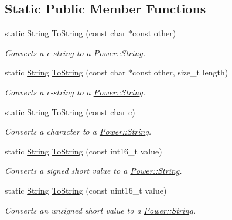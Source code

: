 \subsection*{Static Public Member Functions}
\begin{DoxyCompactItemize}
\item 
static \hyperlink{class_power_1_1_string}{String} \hyperlink{class_power_1_1_string_a8c1588b3f0b9edb49f72ecb3f83e6d8f}{To\+String} (const char $\ast$const other)
\begin{DoxyCompactList}\small\item\em Converts a c-\/string to a \hyperlink{class_power_1_1_string}{Power\+::\+String}. \end{DoxyCompactList}\item 
static \hyperlink{class_power_1_1_string}{String} \hyperlink{class_power_1_1_string_afaa0f16b81fa57e2cf63f319931961aa}{To\+String} (const char $\ast$const other, size\+\_\+t length)
\begin{DoxyCompactList}\small\item\em Converts a c-\/string to a \hyperlink{class_power_1_1_string}{Power\+::\+String}. \end{DoxyCompactList}\item 
static \hyperlink{class_power_1_1_string}{String} \hyperlink{class_power_1_1_string_a0567cc940b3762eb82b1575b42cdb63a}{To\+String} (const char c)
\begin{DoxyCompactList}\small\item\em Converts a character to a \hyperlink{class_power_1_1_string}{Power\+::\+String}. \end{DoxyCompactList}\item 
static \hyperlink{class_power_1_1_string}{String} \hyperlink{class_power_1_1_string_ad2fb9ef1c261109181bfdbe07a99e774}{To\+String} (const int16\+\_\+t value)
\begin{DoxyCompactList}\small\item\em Converts a signed short value to a \hyperlink{class_power_1_1_string}{Power\+::\+String}. \end{DoxyCompactList}\item 
static \hyperlink{class_power_1_1_string}{String} \hyperlink{class_power_1_1_string_a772fcd39002ebfc3bae0a96691bb5d57}{To\+String} (const uint16\+\_\+t value)
\begin{DoxyCompactList}\small\item\em Converts an unsigned short value to a \hyperlink{class_power_1_1_string}{Power\+::\+String}. \end{DoxyCompactList}\item 

\end{DoxyCompactItemize}
